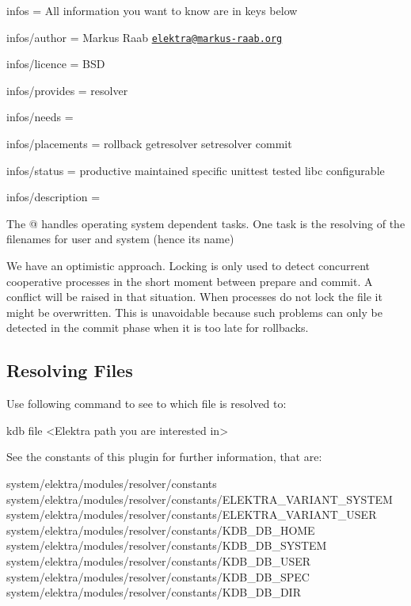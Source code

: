 
\begin{DoxyItemize}
\item infos = All information you want to know are in keys below
\item infos/author = Markus Raab \href{mailto:elektra@markus-raab.org}{\tt elektra@markus-\/raab.\+org}
\item infos/licence = B\+S\+D
\item infos/provides = resolver
\item infos/needs =
\item infos/placements = rollback getresolver setresolver commit
\item infos/status = productive maintained specific unittest tested libc configurable
\item infos/description = 
\end{DoxyItemize}

The @ handles operating system dependent tasks. One task is the resolving of the filenames for user and system (hence its name)

We have an optimistic approach. Locking is only used to detect concurrent cooperative processes in the short moment between prepare and commit. A conflict will be raised in that situation. When processes do not lock the file it might be overwritten. This is unavoidable because such problems can only be detected in the commit phase when it is too late for rollbacks.

\subsection*{Resolving Files}

Use following command to see to which file is resolved to\+: \begin{DoxyVerb}kdb file <Elektra path you are interested in>
\end{DoxyVerb}


See the constants of this plugin for further information, that are\+: \begin{DoxyVerb}system/elektra/modules/resolver/constants
system/elektra/modules/resolver/constants/ELEKTRA_VARIANT_SYSTEM
system/elektra/modules/resolver/constants/ELEKTRA_VARIANT_USER
system/elektra/modules/resolver/constants/KDB_DB_HOME
system/elektra/modules/resolver/constants/KDB_DB_SYSTEM
system/elektra/modules/resolver/constants/KDB_DB_USER
system/elektra/modules/resolver/constants/KDB_DB_SPEC
system/elektra/modules/resolver/constants/KDB_DB_DIR
\end{DoxyVerb}


